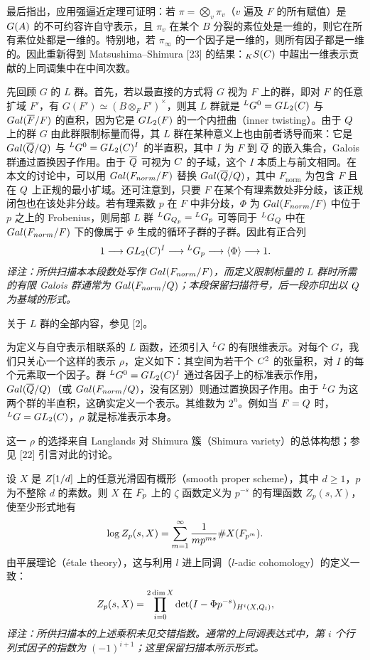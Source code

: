 最后指出，应用强逼近定理可证明：若 $\pi=\bigotimes_v\pi_v$（$v$ 遍及 $F$ 的所有赋值）是 $G(A)$ 的不可约容许自守表示，且 $\pi_v$ 在某个 $B$ 分裂的素位处是一维的，则它在所有素位处都是一维的。特别地，若 $\pi_\infty$ 的一个因子是一维的，则所有因子都是一维的。因此重新得到 Matsushima--Shimura [23] 的结果：${}_KS(C)$ 中超出一维表示贡献的上同调集中在中间次数。

先回顾 $G$ 的 $L$ 群。首先，若以最直接的方式将 $G$ 视为 $F$ 上的群，即对 $F$ 的任意扩域 $F'$，有 $G(F')\simeq(B\otimes_FF')^\times$，则其 $L$ 群就是 ${}^LG^0=GL_2(C)$ 与 $Gal(\overline F/F)$ 的直积，因为它是 $GL_2(F)$ 的一个内扭曲（inner twisting）。由于 $Q$ 上的群 $G$ 由此群限制标量而得，其 $L$ 群在某种意义上也由前者诱导而来：它是 $Gal(\overline{Q}/Q)$ 与 ${}^LG^0=GL_2(C)^I$ 的半直积，其中 $I$ 为 $F$ 到 $\overline{Q}$ 的嵌入集合，Galois 群通过置换因子作用。由于 $\overline{Q}$ 可视为 $C$ 的子域，这个 $I$ 本质上与前文相同。在本文的讨论中，可以用 $Gal(F_{norm}/F)$ 替换 $Gal(\overline{Q}/Q)$，其中 $F_{\mathrm{norm}}$ 为包含 $F$ 且在 $Q$ 上正规的最小扩域。还可注意到，只要 $F$ 在某个有理素数处非分歧，该正规闭包也在该处非分歧。若有理素数 $p$ 在 $F$ 中非分歧，$\Phi$ 为 $Gal(F_{norm}/F)$ 中位于 $p$ 之上的 Frobenius，则局部 $L$ 群 ${}^LG_{Q_p}={}^LG_p$ 可等同于 ${}^LG_Q$ 中在 $Gal(F_{norm}/F)$ 下的像属于 $\Phi$ 生成的循环子群的子群。因此有正合列
\[
 1\longrightarrow GL_2(C)^I\longrightarrow{}^LG_p
 \longrightarrow\langle\Phi\rangle\longrightarrow1.
\]
\noindent\emph{译注：所供扫描本本段数处写作 $Gal(F_{norm}/F)$，而定义限制标量的 $L$ 群时所需的有限 Galois 群通常为 $Gal(F_{norm}/Q)$；本段保留扫描符号，后一段亦印出以 $Q$ 为基域的形式。}

关于 $L$ 群的全部内容，参见 [2]。

为定义与自守表示相联系的 $L$ 函数，还须引入 ${}^LG$ 的有限维表示。对每个 $G$，我们只关心一个这样的表示 $\rho$，定义如下：其空间为若干个 $C^2$ 的张量积，对 $I$ 的每个元素取一个因子。群 ${}^LG^0=GL_2(C)^I$ 通过各因子上的标准表示作用，$Gal(\overline{Q}/Q)$（或 $Gal(F_{norm}/Q)$，没有区别）则通过置换因子作用。由于 ${}^LG$ 为这两个群的半直积，这确实定义一个表示。其维数为 $2^n$。例如当 $F=Q$ 时，${}^LG=GL_2(C)$，$\rho$ 就是标准表示本身。

这一 $\rho$ 的选择来自 Langlands 对 Shimura 簇（Shimura variety）的总体构想；参见 [22] 引言对此的讨论。

设 $X$ 是 $Z[1/d]$ 上的任意光滑固有概形（smooth proper scheme），其中 $d\ge1$，$p$ 为不整除 $d$ 的素数。则 $X$ 在 $F_p$ 上的 $\zeta$ 函数定义为 $p^{-s}$ 的有理函数 $Z_p(s,X)$，使至少形式地有
\[
 \log Z_p(s,X)=\sum_{m=1}^\infty\frac1{mp^{ms}}\#X(F_{p^m}).
\]
由平展理论（étale theory），这与利用 $l$ 进上同调（$l$-adic cohomology）的定义一致：
\[
 Z_p(s,X)=\prod_{i=0}^{2\dim X}
 \det(I-\Phi p^{-s})_{H^i(X,Q_l)},
\]
\noindent\emph{译注：所供扫描本的上述乘积未见交错指数。通常的上同调表达式中，第 $i$ 个行列式因子的指数为 $(-1)^{i+1}$；这里保留扫描本所示形式。}

